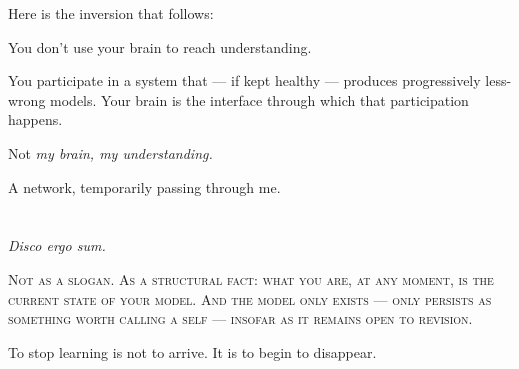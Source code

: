 \documentclass{article}
\begin{document}
Here is the inversion that follows:

You don't use your brain to reach understanding.

You participate in a system that --- if kept healthy --- produces progressively less-wrong models. Your brain is the interface through which that participation happens.

Not \textit{my brain, my understanding.}

A network, temporarily passing through me.

\section*{}

\epigraph{\textit{Disco ergo sum.}}{\textsc{Not as a slogan. As a structural fact: what you are, at any moment, is the current state of your model. And the model only exists --- only persists as something worth calling a self --- insofar as it remains open to revision.}}

To stop learning is not to arrive. It is to begin to disappear.
\end{document}
